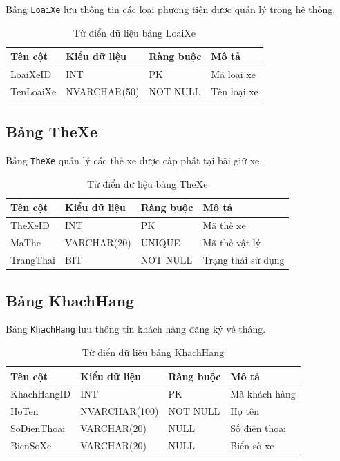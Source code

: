 Bảng \texttt{LoaiXe} lưu thông tin các loại phương tiện được quản lý trong hệ thống.

\begin{table}[htbp]
    \centering
    \begin{tabular}{llll}
        \toprule
        \textbf{Tên cột} & \textbf{Kiểu dữ liệu} & \textbf{Ràng buộc} & \textbf{Mô tả} \\
        \midrule
        LoaiXeID   & INT          & PK       & Mã loại xe \\
        TenLoaiXe  & NVARCHAR(50) & NOT NULL & Tên loại xe \\
        \bottomrule
    \end{tabular}
    \caption{Từ điển dữ liệu bảng LoaiXe}
    \label{tab:loaixe}
\end{table}

\subsection{Bảng TheXe}

Bảng \texttt{TheXe} quản lý các thẻ xe được cấp phát tại bãi giữ xe.

\begin{table}[htbp]
    \centering
    \begin{tabular}{llll}
        \toprule
        \textbf{Tên cột} & \textbf{Kiểu dữ liệu} & \textbf{Ràng buộc} & \textbf{Mô tả} \\
        \midrule
        TheXeID  & INT         & PK     & Mã thẻ xe \\
        MaThe    & VARCHAR(20) & UNIQUE & Mã thẻ vật lý \\
        TrangThai & BIT        & NOT NULL & Trạng thái sử dụng \\
        \bottomrule
    \end{tabular}
    \caption{Từ điển dữ liệu bảng TheXe}
    \label{tab:thexe}
\end{table}

\subsection{Bảng KhachHang}

Bảng \texttt{KhachHang} lưu thông tin khách hàng đăng ký vé tháng.

\begin{table}[htbp]
    \centering
    \begin{tabular}{llll}
        \toprule
        \textbf{Tên cột} & \textbf{Kiểu dữ liệu} & \textbf{Ràng buộc} & \textbf{Mô tả} \\
        \midrule
        KhachHangID & INT          & PK       & Mã khách hàng \\
        HoTen       & NVARCHAR(100) & NOT NULL & Họ tên \\
        SoDienThoai & VARCHAR(20)  & NULL     & Số điện thoại \\
        BienSoXe    & VARCHAR(20)  & NULL     & Biển số xe \\
        \bottomrule
    \end{tabular}
    \caption{Từ điển dữ liệu bảng KhachHang}
    \label{tab:khachhang}
\end{table}

